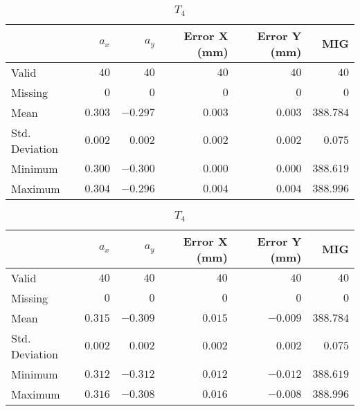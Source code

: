 \begin{table}[h]
    \begin{subtable}{\textwidth}
        \centering
        \footnotesize
        \begin{tabular}{lrrrrr}
            \toprule
                & $a_x$ & $a_y$ & Error X (mm) & Error Y (mm) & MIG  \\
            \midrule
			Valid & $40$ & $40$ & $40$ & $40$ & $40$  \\
			Missing & $0$ & $0$ & $0$ & $0$ & $0$  \\
			Mean & $0.303$ & $-0.297$ & $0.003$ & $0.003$ & $388.784$  \\
			Std. Deviation & $0.002$ & $0.002$ & $0.002$ & $0.002$ & $0.075$  \\
			Minimum & $0.300$ & $-0.300$ & $0.000$ & $0.000$ & $388.619$  \\
			Maximum & $0.304$ & $-0.296$ & $0.004$ & $0.004$ & $388.996$  \\
            \bottomrule
        \end{tabular}
        \caption{$T_3$}
    \end{subtable}

    \vspace{10pt}

    \begin{subtable}{\textwidth}
    \centering
    \footnotesize
    \begin{tabular}{lrrrrr}
        \toprule
            & $a_x$ & $a_y$ & Error X (mm) & Error Y (mm) & MIG  \\
        \midrule
        Valid & $40$ & $40$ & $40$ & $40$ & $40$  \\
        Missing & $0$ & $0$ & $0$ & $0$ & $0$  \\
        Mean & $0.315$ & $-0.309$ & $0.015$ & $-0.009$ & $388.784$  \\
        Std. Deviation & $0.002$ & $0.002$ & $0.002$ & $0.002$ & $0.075$  \\
        Minimum & $0.312$ & $-0.312$ & $0.012$ & $-0.012$ & $388.619$  \\
        Maximum & $0.316$ & $-0.308$ & $0.016$ & $-0.008$ & $388.996$  \\
        \bottomrule
    \end{tabular}
    \caption{$T_4$}
    \end{subtable}

    \vspace{10pt}


\end{table}
